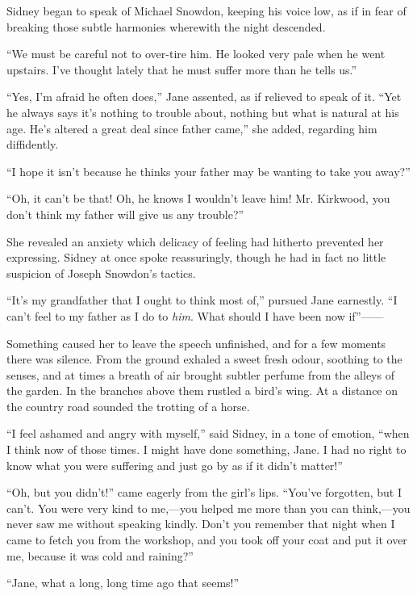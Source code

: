 Sidney began to speak of Michael Snowdon, keeping his voice low, as if
in fear of breaking those subtle harmonies wherewith the night
descended.

``We must be careful not to over-tire him. He looked very pale when he
went upstairs. I've thought lately that he must suffer more than he
tells us.''

``Yes, I'm afraid he often does,'' Jane assented, as if relieved to
speak of it. ``Yet he always says it's nothing to trouble about, nothing
but what is natural at his age. He's altered a great deal since father
came,'' she added, regarding him diffidently.

``I hope it isn't because he thinks your father may be wanting to take
you away?''

``Oh, it can't be that! Oh, he knows I
{\protect\hypertarget{116}{}{}}wouldn't leave him! Mr. Kirkwood, you
don't think my father will give us any trouble?''

She revealed an anxiety which delicacy of feeling had hitherto prevented
her expressing. Sidney at once spoke reassuringly, though he had in fact
no little suspicion of Joseph Snowdon's tactics.

``It's my grandfather that I ought to think most of,'' pursued Jane
earnestly. ``I can't feel to my father as I do to \emph{him}. What
should I have been now if''{{------}}

Something caused her to leave the speech unfinished, and for a few
moments there was silence. From the ground exhaled a sweet fresh odour,
soothing to the senses, and at times a breath of air brought subtler
perfume from the alleys of the garden. In the branches above them
rustled a bird's wing. At a distance on the country road sounded the
trotting of a horse.

``I feel ashamed and angry with myself,'' said Sidney, in a tone of
emotion, ``when I think now of those times. I might have
{\protect\hypertarget{117}{}{}}done something, Jane. I had no right to
know what you were suffering and just go by as if it didn't matter!''

``Oh, but you didn't!'' came eagerly from the girl's lips. ``You've
forgotten, but I can't. You were very kind to me,---you helped me more
than you can think,---you never saw me without speaking kindly. Don't
you remember that night when I came to fetch you from the workshop, and
you took off your coat and put it over me, because it was cold and
raining?''

``Jane, what a long, long time ago that seems!''

